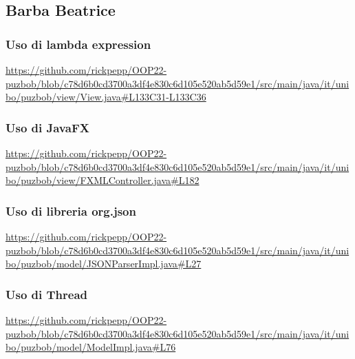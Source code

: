 \documentclass[a4paper,12pt]{report}
\begin{document}
\subsection{Barba Beatrice}
\subsubsection{Uso di lambda expression}
\centering
\url{https://github.com/rickpepp/OOP22-puzbob/blob/c78d6b0cd3700a3df4e830c6d105e520ab5d59e1/src/main/java/it/unibo/puzbob/view/View.java#L133C31-L133C36}

\subsubsection{Uso  di JavaFX}
\centering
\url{https://github.com/rickpepp/OOP22-puzbob/blob/c78d6b0cd3700a3df4e830c6d105e520ab5d59e1/src/main/java/it/unibo/puzbob/view/FXMLController.java#L182}

\subsubsection{Uso di libreria org.json}
\centering
\url{https://github.com/rickpepp/OOP22-puzbob/blob/c78d6b0cd3700a3df4e830c6d105e520ab5d59e1/src/main/java/it/unibo/puzbob/model/JSONParserImpl.java#L27}

\subsubsection{Uso di Thread}
\centering
\url{https://github.com/rickpepp/OOP22-puzbob/blob/c78d6b0cd3700a3df4e830c6d105e520ab5d59e1/src/main/java/it/unibo/puzbob/model/ModelImpl.java#L76}
\end{document}
